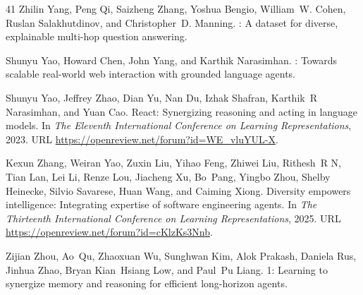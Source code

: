 \documentclass{article}
\begin{document}
\begin{thebibliography}{41}
Zhilin Yang, Peng Qi, Saizheng Zhang, Yoshua Bengio, William~W. Cohen, Ruslan Salakhutdinov, and Christopher~D. Manning.
: A dataset for diverse, explainable multi-hop question answering.

Shunyu Yao, Howard Chen, John Yang, and Karthik Narasimhan.
: Towards scalable real-world web interaction with grounded language agents.

Shunyu Yao, Jeffrey Zhao, Dian Yu, Nan Du, Izhak Shafran, Karthik~R Narasimhan, and Yuan Cao.
\newblock React: Synergizing reasoning and acting in language models.
\newblock In \emph{The Eleventh International Conference on Learning Representations}, 2023.
\newblock URL \url{https://openreview.net/forum?id=WE_vluYUL-X}.

Kexun Zhang, Weiran Yao, Zuxin Liu, Yihao Feng, Zhiwei Liu, Rithesh~R N, Tian Lan, Lei Li, Renze Lou, Jiacheng Xu, Bo~Pang, Yingbo Zhou, Shelby Heinecke, Silvio Savarese, Huan Wang, and Caiming Xiong.
\newblock Diversity empowers intelligence: Integrating expertise of software engineering agents.
\newblock In \emph{The Thirteenth International Conference on Learning Representations}, 2025.
\newblock URL \url{https://openreview.net/forum?id=cKlzKs3Nnb}.

Zijian Zhou, Ao~Qu, Zhaoxuan Wu, Sunghwan Kim, Alok Prakash, Daniela Rus, Jinhua Zhao, Bryan Kian~Hsiang Low, and Paul~Pu Liang.
1: Learning to synergize memory and reasoning for efficient long-horizon agents.

\end{thebibliography}

\appendix
\end{document}
